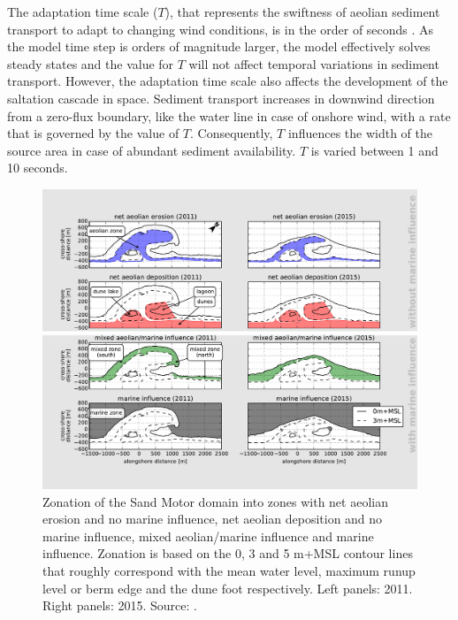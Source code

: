 The adaptation time scale ($T$), that represents the swiftness of
aeolian sediment transport to adapt to changing wind conditions, is in
the order of seconds \citep{DavidsonArnott2008, deVries2014a}. As the
model time step is orders of magnitude larger, the model effectively
solves steady states and the value for $T$ will not affect temporal
variations in sediment transport. However, the adaptation time scale
also affects the development of the saltation cascade in
space. Sediment transport increases in downwind direction from a
zero-flux boundary, like the water line in case of onshore wind, with
a rate that is governed by the value of $T$. Consequently, $T$
influences the width of the source area in case of abundant sediment
availability. $T$ is varied between 1 and 10 seconds.

\begin{figure}
  \centering
  \includegraphics[width=1.2\columnwidth, angle=90]{../Figures/decomposition}
  \caption{Zonation of the Sand Motor domain into zones with net
    aeolian erosion and no marine influence, net aeolian deposition
    and no marine influence, mixed aeolian/marine influence and marine
    influence. Zonation is based on the 0, 3 and 5 m+MSL contour lines
    that roughly correspond with the mean water level, maximum runup
    level or berm edge and the dune foot respectively. Left panels:
    2011. Right panels: 2015. Source: \citet{Hoonhout2017a}.}
  \label{fig:decomposition2}
\end{figure}

